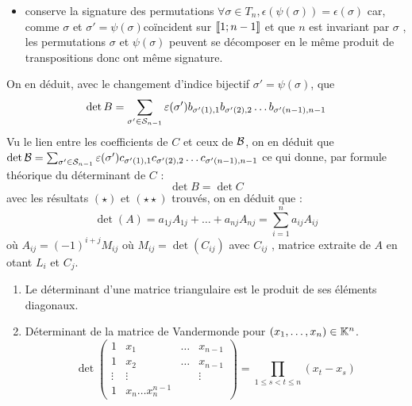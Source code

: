 \begin{dem}
\begin{itemize}
        \item  conserve la signature des permutations \ie \(\forall \sigma  \in T_n, \epsilon (\psi(\sigma )) = \epsilon(\sigma )\) car, comme \(\sigma\)  et \(\sigma ' = \psi(\sigma )\)coïncident sur \(\interventierii{1}{n-1}\) et que \(n\) est invariant par \(\sigma\) , les permutations \(\sigma\)  et \(\psi(\sigma )\) peuvent se décomposer en le même produit de transpositions donc ont même signature.
    \end{itemize}
    On en déduit, avec le changement d’indice bijectif \(\sigma ' = \psi(\sigma )\), que 
    \[\det B = \sum_{\sigma '\in\cal{S}_{n-1}}\epsilon(\sigma ')b_{\sigma '(1),1}b_{\sigma '(2),2} \dots b_{\sigma '(n-1),n-1}\]
    Vu le lien entre les coefficients de \(C\) et ceux de \(\cal{B}\), on en déduit que \(\det \cal{B} = \sum_{\sigma '\in\cal{S}_{n-1}} \epsilon(\sigma ')c_{\sigma '(1),1}c_{\sigma '(2),2} \dots c_{\sigma '(n-1),n-1}\) ce qui donne, par formule théorique du déterminant de \(C\) :
    \[\det B = \det C\]
    \conclusion avec les résultats \((\star)\) et \((\star\star)\) trouvés, on en déduit que :
    \[\det(A) = a_{1j} A_{1j} + \dots + a_{nj} A_{nj} = \sum^n_{i=1} a_{ij} A_{ij} \]
    où \(A_{ij} = (-1)^{i+j} M_{ij}\) où \(M_{ij} = \det (C_{ij} )\) avec \(C_{ij}\) , matrice extraite de \(A\) en otant \(L_i\) et \(C_j\).
\end{dem}

\begin{defprop}
    \begin{enumerate}
        \item Le déterminant d’une matrice triangulaire est le produit de ses éléments diagonaux.
        \item Déterminant de la matrice de Vandermonde pour \((x_1, \dots  , x_n) \in  \K^n \).
        \[\det\begin{pmatrix}
            1 & x_1 & \dots & x_{n-1}\\
            1 & x_2 & \dots & x_{n-1}\\
            \vdots & \vdots &&\vdots \\
            1 & x_n \dots  x^{n-1}_n 
            \end{pmatrix} = \prod_{1\leq s<t\leq n}(x_t - x_s)
        \]
    \end{enumerate}
\end{defprop}

